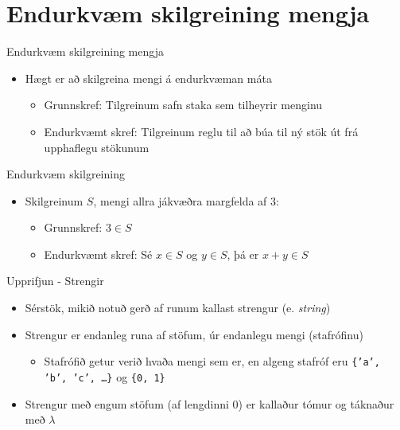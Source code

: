 \documentclass[handout]{beamer}
\begin{document}
\section{Endurkvæm skilgreining mengja}

\begin{frame}{Endurkvæm skilgreining mengja}
\begin{itemize}
 \item Hægt er að skilgreina mengi á endurkvæman máta 
 \begin{itemize}
  \item Grunnskref: Tilgreinum safn staka sem tilheyrir menginu
  \item Endurkvæmt skref: Tilgreinum reglu til að búa til ný stök út frá upphaflegu stökunum
 \end{itemize}
\end{itemize}
\end{frame}

\begin{frame}{Endurkvæm skilgreining}
\begin{itemize}
 \item Skilgreinum $S$, mengi allra jákvæðra margfelda af $3$:
 \begin{itemize}
  \item Grunnskref: $3 \in S$
  \item Endurkvæmt skref: Sé $x \in S$ og $y \in S$, þá er $x+y \in S$
 \end{itemize}
\end{itemize}
\end{frame}

\begin{frame}[fragile]{Upprifjun - Strengir}
\begin{itemize}
 \item Sérstök, mikið notuð gerð af runum kallast strengur (e. \emph{string})
 \item Strengur er endanleg runa af stöfum, úr endanlegu mengi (stafrófinu)
 \begin{itemize}
  \item Stafrófið getur verið hvaða mengi sem er, en algeng stafróf eru \texttt{\{'a', 'b', 'c', \ldots\}} og \texttt{\{0, 1\}}
 \end{itemize}
 \item Strengur með engum stöfum (af lengdinni $0$) er kallaður tómur og táknaður með $\lambda$
\end{itemize}
\end{frame}
\end{document}
